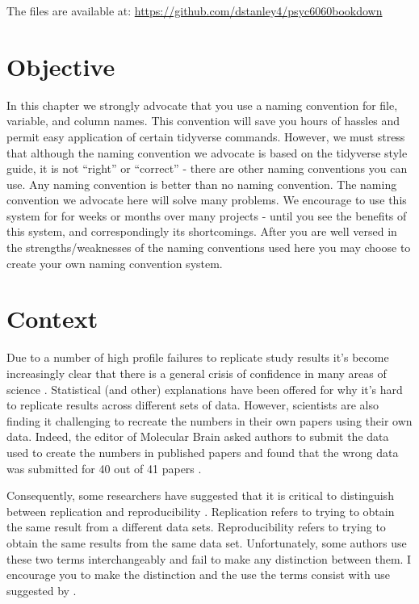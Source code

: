 \documentclass[
]{krantz}
\begin{document}
The files are available at: \url{https://github.com/dstanley4/psyc6060bookdown}

\hypertarget{objective-1}{%
\section{Objective}\label{objective-1}}

In this chapter we strongly advocate that you use a naming convention for file, variable, and column names. This convention will save you hours of hassles and permit easy application of certain tidyverse commands. However, we must stress that although the naming convention we advocate is based on the tidyverse style guide, it is not ``right'' or ``correct'' - there are other naming conventions you can use. Any naming convention is better than no naming convention. The naming convention we advocate here will solve many problems. We encourage to use this system for for weeks or months over many projects - until you see the benefits of this system, and correspondingly its shortcomings. After you are well versed in the strengths/weaknesses of the naming conventions used here you may choose to create your own naming convention system.

\hypertarget{context}{%
\section{Context}\label{context}}

Due to a number of high profile failures to replicate study results \citep{cos2015} it's become increasingly clear that there is a general crisis of confidence in many areas of science \citep{baker2016}. Statistical (and other) explanations have been offered \citep{simmons2011} for why it's hard to replicate results across different sets of data. However, scientists are also finding it challenging to recreate the numbers in their own papers using their own data. Indeed, the editor of Molecular Brain asked authors to submit the data used to create the numbers in published papers and found that the wrong data was submitted for 40 out of 41 papers \citep{miyakawa2020}.

Consequently, some researchers have suggested that it is critical to distinguish between replication and reproducibility \citep{patil2019}. Replication refers to trying to obtain the same result from a different data sets. Reproducibility refers to trying to obtain the same results from the same data set. Unfortunately, some authors use these two terms interchangeably and fail to make any distinction between them. I encourage you to make the distinction and the use the terms consist with use suggested by \citep{patil2019}.
\end{document}
